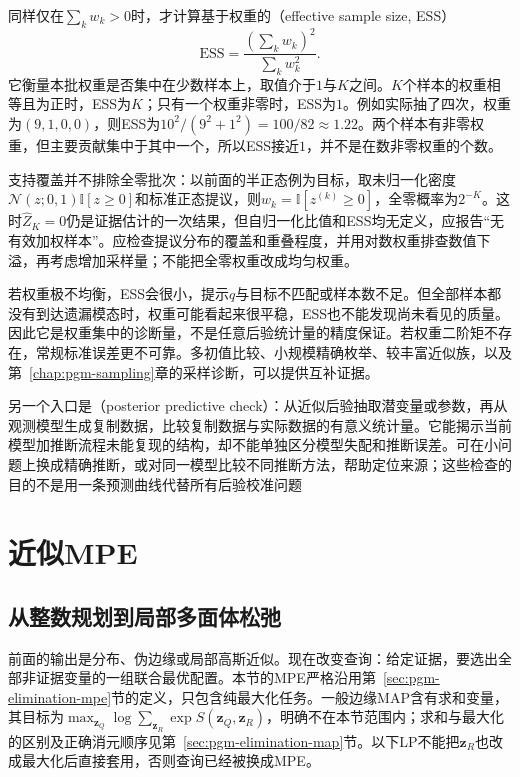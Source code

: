 同样仅在$\sum_kw_k>0$时，才计算基于权重的（effective sample size, ESS）
\[
  \widehat{\mathrm{ESS}}
  =\frac{(\sum_kw_k)^2}{\sum_kw_k^2}.
\]
它衡量本批权重是否集中在少数样本上，取值介于$1$与$K$之间。$K$个样本的权重相等且为正时，ESS为$K$；只有一个权重非零时，ESS为$1$。例如实际抽了四次，权重为$(9,1,0,0)$，则ESS为$10^2/(9^2+1^2)=100/82\approx1.22$。两个样本有非零权重，但主要贡献集中于其中一个，所以ESS接近$1$，并不是在数非零权重的个数。

支持覆盖并不排除全零批次：以前面的半正态例为目标，取未归一化密度$\mathcal N(z;0,1)\mathbb I[z\geq0]$和标准正态提议，则$w_k=\mathbb I[z^{(k)}\geq0]$，全零概率为$2^{-K}$。这时$\widehat Z_K=0$仍是证据估计的一次结果，但自归一化比值和ESS均无定义，应报告“无有效加权样本”。应检查提议分布的覆盖和重叠程度，并用对数权重排查数值下溢，再考虑增加采样量；不能把全零权重改成均匀权重。

若权重极不均衡，ESS会很小，提示$q$与目标不匹配或样本数不足。但全部样本都没有到达遗漏模态时，权重可能看起来很平稳，ESS也不能发现尚未看见的质量。因此它是权重集中的诊断量，不是任意后验统计量的精度保证。若权重二阶矩不存在，常规标准误差更不可靠。多初值比较、小规模精确枚举、较丰富近似族，以及第~\ref{chap:pgm-sampling}章的采样诊断，可以提供互补证据。

另一个入口是（posterior predictive check）：从近似后验抽取潜变量或参数，再从观测模型生成复制数据，比较复制数据与实际数据的有意义统计量。它能揭示当前模型加推断流程未能复现的结构，却不能单独区分模型失配和推断误差。可在小问题上换成精确推断，或对同一模型比较不同推断方法，帮助定位来源；这些检查的目的不是用一条预测曲线代替所有后验校准问题

\section{近似MPE}
\label{sec:pgm-variational-mpe}

\subsection{从整数规划到局部多面体松弛}
\label{sec:pgm-variational-ilp-local-polytope}
\label{sec:pgm-variational-lp}

前面的输出是分布、伪边缘或局部高斯近似。现在改变查询：给定证据，要选出全部非证据变量的一组联合最优配置。本节的MPE严格沿用第~\ref{sec:pgm-elimination-mpe}节的定义，只包含纯最大化任务。一般边缘MAP含有求和变量，其目标为$\max_{\bm z_Q}\log\sum_{\bm z_R}\exp S(\bm z_Q,\bm z_R)$，明确不在本节范围内；求和与最大化的区别及正确消元顺序见第~\ref{sec:pgm-elimination-map}节。以下LP不能把$\bm z_R$也改成最大化后直接套用，否则查询已经被换成MPE。

